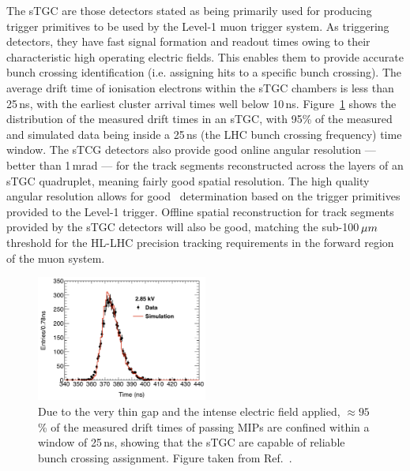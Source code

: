 The sTGC are those detectors stated as being primarily used for producing trigger primitives
to be used by the Level-1 muon trigger system.
As triggering detectors, they have fast signal formation and readout times owing to their characteristic high
operating electric fields.
This enables
them to provide accurate bunch crossing identification (i.e. assigning hits to a specific bunch crossing).
The average drift time of ionisation electrons within the sTGC chambers is less than 25\,ns,
with the earliest cluster arrival times well below 10\,ns.
Figure~\ref{fig:stgc_timing} shows the distribution of the measured drift times in an
sTGC, with 95\% of the measured and simulated data being inside a 25\,ns (the LHC bunch crossing
frequency) time window.
The sTCG detectors also provide good online angular resolution --- better than 1\,mrad --- for the track segments
reconstructed across the layers of an sTGC quadruplet, meaning fairly good spatial resolution.
The high quality angular resolution allows for good \pT~determination based on the trigger primitives
provided to the Level-1 trigger.
Offline spatial reconstruction for track segments provided by the sTGC detectors will also be good, matching
the sub-100$\,\mu m$ threshold for the HL-LHC precision tracking requirements in the forward region
of the muon system.

\begin{figure}[!htb]
    \begin{center}
        \includegraphics[width=0.5\textwidth]{figures/nsw/stgc_timing}
        \caption{
            Due to the very thin gap and the intense electric field applied,
            $\approx95$\,\% of the measured drift times of passing MIPs are
            confined within a window of 25\,ns, showing that the sTGC
            are capable of reliable bunch crossing assignment.
            Figure taken from Ref.~\cite{NSWTDR}.
        }
        \label{fig:stgc_timing}
    \end{center}
\end{figure}

